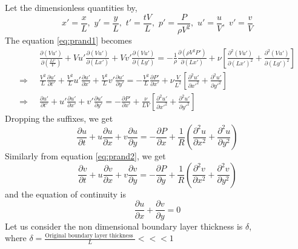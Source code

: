 \documentclass[../main-sheet.tex]{subfiles}
\begin{document}
\begin{soln}
    Let the dimensionless quantities by,
    \[
        x'=\frac{x }{L },\,\,y'=\frac{y }{L },\,\, t'=\frac{t V }{L },\,\, p'=\frac{P }{\rho V^2},\,\, u'=\frac{u }{V },\,\,v'=\frac{v }{V }
    \]
    The equation \eqref{eq:prand1} becomes
    \begin{align*}
        & \frac{\partial (Vu')}{\partial \left( \frac{L t' }{V } \right)}+Vu'\frac{\partial \left( Vu' \right)}{\partial (Lx') }+Vv'\frac{\partial (Vu')}{\partial (Ly') }=-\frac{1}{\rho}\frac{\partial (\rho V^2 P')}{\partial (Lx') }+\nu\left[ \frac{\partial^2 (Vu')}{\partial \left( L x'\right)^2}+\frac{\partial^2 (Vu')}{\partial \left( L y'\right)^2}\right]\\
        \Rightarrow\;\;& \frac{V^2 }{L}\frac{\partial u'}{\partial  t'}+\frac{V^2 }{L}u'\frac{\partial u'}{\partial x' }+\frac{V^2 }{L}v'\frac{\partial u'}{\partial y' }=-\frac{V^2 }{L} \frac{\partial  P'}{\partial x' }+\nu\frac{V}{L^2}\left[ \frac{\partial^2 u'}{\partial  x'^2}+\frac{\partial^2 u'}{\partial y'^2}\right]\\
        \Rightarrow\;\;& \frac{\partial u'}{\partial  t'}+u'\frac{\partial u'}{\partial x' }+v'\frac{\partial u'}{\partial y' }=-\frac{\partial  P'}{\partial x' }+\frac{\nu}{L V }\left[ \frac{\partial^2 u'}{\partial  x'^2}+\frac{\partial^2 u'}{\partial y'^2}\right]
    \end{align*}
    Dropping the suffixes, we get
    \begin{equation}
        \frac{\partial u}{\partial  t}+u\frac{\partial u}{\partial x}+v\frac{\partial u}{\partial y}=-\frac{\partial  P}{\partial x}+\frac{1}{R}\left( \frac{\partial^2 u}{\partial  x^2}+\frac{\partial^2 u}{\partial y^2}\right) 
        \label{eq:prand4}
    \end{equation}
    Similarly from equation \eqref{eq:prand2}, we get
    \begin{equation}
        \frac{\partial v}{\partial  t}+u\frac{\partial v}{\partial x}+v\frac{\partial v}{\partial y}=-\frac{\partial  P}{\partial y}+\frac{1}{R}\left( \frac{\partial^2 v}{\partial  x^2}+\frac{\partial^2 v}{\partial y^2}\right) 
        \label{eq:prand5}
    \end{equation}
    and the equation of continuity is
    \begin{equation}
        \frac{\partial u}{\partial x }+\frac{\partial v}{\partial y }=0 \label{eq:prand6}
    \end{equation} 
    Let us consider the non dimensional boundary layer thickness is \(\delta\),\\
    where \(\displaystyle \delta=\frac{\text{Original boundary layer thickness }}{L }<<<1\)\\

\end{soln}
\end{document}
